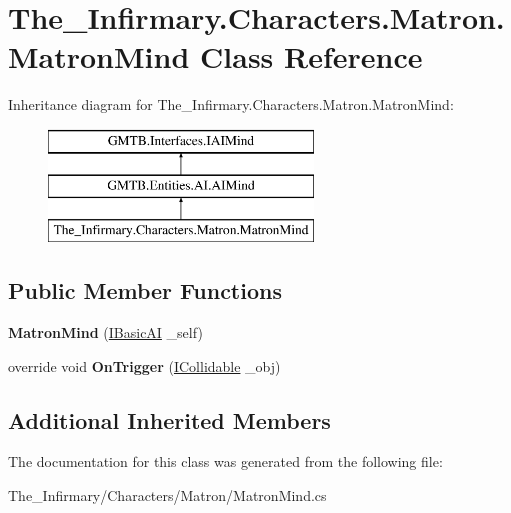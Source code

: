 \hypertarget{class_the___infirmary_1_1_characters_1_1_matron_1_1_matron_mind}{}\section{The\+\_\+\+Infirmary.\+Characters.\+Matron.\+Matron\+Mind Class Reference}
\label{class_the___infirmary_1_1_characters_1_1_matron_1_1_matron_mind}
Inheritance diagram for The\+\_\+\+Infirmary.\+Characters.\+Matron.\+Matron\+Mind\+:\begin{figure}[H]
\begin{center}
\leavevmode
\includegraphics[height=3.000000cm]{class_the___infirmary_1_1_characters_1_1_matron_1_1_matron_mind}
\end{center}
\end{figure}
\subsection*{Public Member Functions}
\begin{DoxyCompactItemize}
\item 
\mbox{\label{class_the___infirmary_1_1_characters_1_1_matron_1_1_matron_mind_afb7ff4f7b0f9358a5dc02c311205b4cd}} 
{\bfseries Matron\+Mind} (\mbox{\hyperlink{interface_g_m_t_b_1_1_interfaces_1_1_i_basic_a_i}{I\+Basic\+AI}} \+\_\+self)
\item 
\mbox{\label{class_the___infirmary_1_1_characters_1_1_matron_1_1_matron_mind_afd7a873a64efddbf69bf08caebf3f8e9}} 
override void {\bfseries On\+Trigger} (\mbox{\hyperlink{interface_g_m_t_b_1_1_collision_system_1_1_i_collidable}{I\+Collidable}} \+\_\+obj)
\end{DoxyCompactItemize}
\subsection*{Additional Inherited Members}


The documentation for this class was generated from the following file\+:\begin{DoxyCompactItemize}
\item 
The\+\_\+\+Infirmary/\+Characters/\+Matron/Matron\+Mind.\+cs\end{DoxyCompactItemize}
